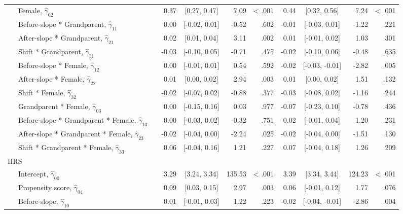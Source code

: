 \documentclass[
  english,
  man, noextraspace,floatsintext]{apa7}
\newenvironment{lltable}{\begin{landscape}\begin{center}\begin{ThreePartTable}}{\end{ThreePartTable}\end{center}\end{landscape}}
\begin{document}
\begin{lltable}
{\begin{longtable}{lrcrrrcrr}
\ \ \ Female, $\hat{\gamma}_{02}$ \textcolor{white}{L} & 0.37 & {}[0.27, 0.47] & 7.09 & < .001 & 0.44 & {}[0.32, 0.56] & 7.24 & < .001\\
\ \ \ Before-slope * Grandparent, $\hat{\gamma}_{11}$ \textcolor{white}{L} & 0.00 & {}[-0.02, 0.01] & -0.52 & .602 & -0.01 & {}[-0.03, 0.01] & -1.22 & .221\\
\ \ \ After-slope * Grandparent, $\hat{\gamma}_{21}$ \textcolor{white}{L} & 0.02 & {}[0.01, 0.04] & 3.11 & .002 & 0.01 & {}[-0.01, 0.02] & 1.03 & .301\\
\ \ \ Shift * Grandparent, $\hat{\gamma}_{31}$ \textcolor{white}{L} & -0.03 & {}[-0.10, 0.05] & -0.71 & .475 & -0.02 & {}[-0.10, 0.06] & -0.48 & .635\\
\ \ \ Before-slope * Female, $\hat{\gamma}_{12}$ \textcolor{white}{L} & 0.00 & {}[-0.01, 0.01] & 0.54 & .592 & -0.02 & {}[-0.03, -0.01] & -2.82 & .005\\
\ \ \ After-slope * Female, $\hat{\gamma}_{22}$ \textcolor{white}{L} & 0.01 & {}[0.00, 0.02] & 2.94 & .003 & 0.01 & {}[0.00, 0.02] & 1.51 & .132\\
\ \ \ Shift * Female, $\hat{\gamma}_{32}$ \textcolor{white}{L} & -0.02 & {}[-0.07, 0.02] & -0.88 & .377 & -0.03 & {}[-0.08, 0.02] & -1.16 & .244\\
\ \ \ Grandparent * Female, $\hat{\gamma}_{03}$ \textcolor{white}{L} & 0.00 & {}[-0.15, 0.16] & 0.03 & .977 & -0.07 & {}[-0.23, 0.10] & -0.78 & .436\\
\ \ \ Before-slope * Grandparent * Female, $\hat{\gamma}_{13}$ \textcolor{white}{L} & 0.00 & {}[-0.03, 0.02] & -0.32 & .751 & 0.02 & {}[-0.01, 0.04] & 1.20 & .231\\
\ \ \ After-slope * Grandparent * Female, $\hat{\gamma}_{23}$ \textcolor{white}{L} & -0.02 & {}[-0.04, 0.00] & -2.24 & .025 & -0.02 & {}[-0.04, 0.00] & -1.51 & .130\\
\ \ \ Shift * Grandparent * Female, $\hat{\gamma}_{33}$ \textcolor{white}{L} & 0.06 & {}[-0.04, 0.16] & 1.21 & .227 & 0.07 & {}[-0.04, 0.18] & 1.26 & .209\\
HRS &  &  &  &  &  &  &  & \\
\ \ \ Intercept, $\hat{\gamma}_{00}$ \textcolor{white}{H} & 3.29 & {}[3.24, 3.34] & 135.53 & < .001 & 3.39 & {}[3.34, 3.44] & 124.23 & < .001\\
\ \ \ Propensity score, $\hat{\gamma}_{04}$ \textcolor{white}{H} & 0.09 & {}[0.03, 0.15] & 2.97 & .003 & 0.06 & {}[-0.01, 0.12] & 1.77 & .076\\
\ \ \ Before-slope, $\hat{\gamma}_{10}$ \textcolor{white}{H} & 0.01 & {}[-0.01, 0.03] & 1.22 & .223 & -0.02 & {}[-0.04, -0.01] & -2.86 & .004\\

\end{longtable}}
\end{lltable}
\end{document}
